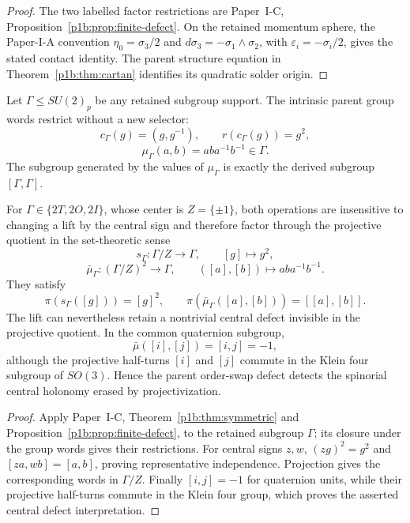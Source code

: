 \documentclass[12pt,a4paper]{article}
\begin{document}
\begin{proof}
The two labelled factor restrictions are Paper~I-C,
Proposition~\ref{p1b:prop:finite-defect}.  On the retained momentum
sphere, the Paper-I-A convention \(\eta_0=\sigma_3/2\) and
\(d\sigma_3=-\sigma_1\wedge\sigma_2\), with
\(\varepsilon_i=-\sigma_i/2\), gives the stated contact identity.
The parent structure equation in Theorem~\ref{p1b:thm:cartan} identifies
its quadratic solder origin.
\end{proof}

\begin{theorem}
\label{p3b:thm:v188-finite-defect-restriction}
Let $\Gamma\le SU(2)_p$ be any retained subgroup support.  The intrinsic
parent group words restrict without a new selector:
\[
 c_\Gamma(g)=(g,g^{-1}),\qquad
 r(c_\Gamma(g))=g^2,
\]
\[
 \mu_\Gamma(a,b)=aba^{-1}b^{-1}\in\Gamma.
\]
The subgroup generated by the values of $\mu_\Gamma$ is exactly the derived
subgroup $[\Gamma,\Gamma]$.

For $\Gamma\in\{2T,2O,2I\}$, whose center is $Z=\{\pm1\}$, both operations
are insensitive to changing a lift by the central sign and therefore factor
through the projective quotient in the set-theoretic sense
\[
 s_\Gamma:\Gamma/Z\to\Gamma,\qquad [g]\mapsto g^2,
\]
\[
 \bar\mu_\Gamma:(\Gamma/Z)^2\to\Gamma,\qquad
 ([a],[b])\mapsto aba^{-1}b^{-1}.
\]
They satisfy
\[
 \pi(s_\Gamma([g]))=[g]^2,
 \qquad
 \pi(\bar\mu_\Gamma([a],[b]))=[[a],[b]].
\]
The lift can nevertheless retain a nontrivial central defect invisible in the
projective quotient.  In the common quaternion subgroup,
\[
 \boxed{\bar\mu([i],[j])=[i,j]=-1,}
\]
although the projective half-turns $[i]$ and $[j]$ commute in the Klein four
subgroup of $SO(3)$.  Hence the parent order-swap defect detects the spinorial
central holonomy erased by projectivization.
\end{theorem}

\begin{proof}
Apply Paper~I-C, Theorem~\ref{p1b:thm:symmetric} and
Proposition~\ref{p1b:prop:finite-defect}, to the retained subgroup
\(\Gamma\); its closure under the group words gives their restrictions.
For central signs \(z,w\), \((zg)^2=g^2\) and
\([za,wb]=[a,b]\), proving representative independence.  Projection gives
the corresponding words in \(\Gamma/Z\).  Finally \([i,j]=-1\) for
quaternion units, while their projective half-turns commute in the Klein
four group, which proves the asserted central defect interpretation.
\end{proof}
\end{document}
